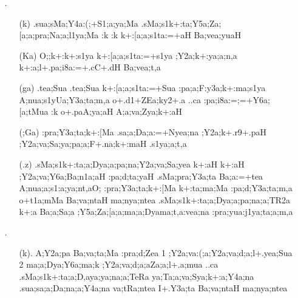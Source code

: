 \begin{spacing}{1.15}
\begin{itemize}
\item[{\sktf 11}.] \begin{itemize}
        \item[({\sktf k})] {\sktf .sua;sMa;Y4a:(;+S1;a;ya;Ma
.sMa;s1k+:ta;Y5a;Za;[a;a;pra;Na;a;l1ya;Ma :k
:k k+:[a;a;s1ta:=+aH Ba;vea;yuaH}
           
           \item[({\sktf Ka})] {\sktf O;;k+:k+:s1ya
k+:[a;a;s1ta:=+s1ya ;Y2a;k+:ya;a;n,a k+:a;l+.pa;i8a:=+.cC+.dH
Ba;vea;t,a}
            
           \item[({\sktf ga})] {\sktf .tea;Sua .tea;Sua
k+:[a;a;s1ta:=+Sua :pa;a;F:y3a;k+:ma;s1ya
A;nua;s1yUa;Y3a;ta;m,a o+.d1+ZEa;ky2+.a ..ca
:pa;i8a:=;=+Y6a;[a;tMua :k o+.paA;ya;aH A;a;va;Zya;k+:aH}
           
           \item[({\sktf ;Ga})] {\sktf :pra;Y3a;ta;k+:[Ma .sa;a;Da;a:=+Nyea;na
;Y2a;k+.r9+.paH ;Y2a;va;Sa;ya;pa;a;F+.na;k+:maH
.s1ya;a;t,a} 
           
           \item[({\sktf .z})] {\sktf .sMa;s1k+:ta;a;Dya;a;pa;na;Y2a;va;Sa;yea k+:aH k+:aH
;Y2a;va;Y6a;Ba;n1a;aH :pa;d;ta;yaH .sMa;pra;Y3a;ta
Ba;a:=+tea A;nua;a;s1:a;ya;nt,aO;  :pra;Y3a;ta;k+:[Ma k+:ta;ma;Ma :pa;d;Y3a;ta;m,a o+t1a;mMa
Ba;va;ntaH ma;nya;ntea  .sMa;s1k+:ta;a;Dya;a;pa;na;a;TR2a k+:a Ba;a;Sa;a
{;Y5a;Za;[a;a;ma;a}{;Dya}{ma;t,a:vea;na} :pra;yua:j1ya;ta;a;m,a }
           \end{itemize}

\item[{\sktf 12}.]\begin{itemize}
        \item[({\sktf k}).] {\sktf A;Y2a;pa Ba;va;ta;Ma :pra;d;Zea
\ZF{(}1\ZF{)} ;Y2a;va:(;a;Y2a;va;d;a;l+.yea;Sua
\ZF{(}2\ZF{)} ma;a;Dya;Y6a;ma;k ;Y2a;va;d;a;a\ZF{-}Za;a;l+.a;mua
..ca .sMa;s1k+:ta;a;D,aya;ya;na;a;TeRa ya;Ta;a;va;Sya;k+:a;Y4a;na .sua;sa;a;Da;na;a;Y4a;na
va;tRa;ntea I+.Y3a;ta Ba;va;ntaH ma;nya;ntea}
                

\end{itemize}
\end{itemize}
\end{spacing}
